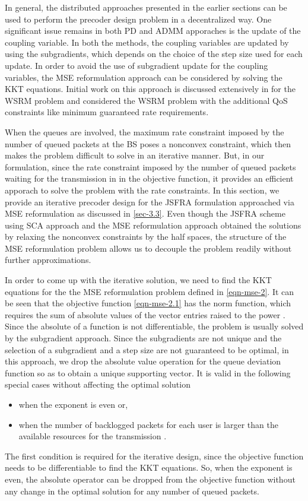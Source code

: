 
In general, the distributed approaches presented in the earlier sections can be used to perform the precoder design problem in a decentralized way. One significant issue remains in both \acl{PD} and \ac{ADMM} apporaches is the update of the coupling variable. In both the methods, the coupling variables are updated by using the subgradients, which depends on the choice of the step size used for each update. In order to avoid the use of subgradient update for the coupling variables, the \ac{MSE} reformulation approach can be considered by solving the \ac{KKT} equations. Initial work on this approach is discussed extensively in \cite{wmmse_shi} for the \ac{WSRM} problem and \cite{kaleva2012weighted} considered the \ac{WSRM} problem with the additional \ac{QoS} constraints like minimum guaranteed rate requirements.

When the queues are involved, the maximum rate constraint imposed by the number of queued packets at the \ac{BS} poses a nonconvex constraint, which then makes the problem difficult to solve in an iterative manner. But, in our formulation, since the rate constraint imposed by the number of queued packets waiting for the transmission in in the objective function, it provides an efficient apporach to solve the problem with the rate constraints. In this section, we provide an iterative precoder design for the \ac{JSFRA} formulation approached via \ac{MSE} reformulation as discussed in \ref{sec-3.3}. Even though the \ac{JSFRA} scheme using \ac{SCA} approach and the \ac{MSE} reformulation approach obtained the solutions by relaxing the nonconvex constraints by the half spaces, the structure of the \ac{MSE} reformulation problem allows us to decouple the problem readily without further approximations.

In order to come up with the iterative solution, we need to find the \ac{KKT} equations for the the \ac{MSE} reformulation problem defined in \eqref{eqn-mse-2}. It can be seen that the objective function \eqref{eqn-mse-2.1} has the norm function, which requires the sum of absolute values of the vector entries raised to the power . Since the absolute of a function is not differentiable, the problem is usually solved by the subgradient approach. Since the subgradients are not unique and the selection of a subgradient and a step size are not guaranteed to be optimal, in this approach, we drop the absolute value operation for the queue deviation function so as to obtain a unique supporting vector. It is valid in the following special cases without affecting the optimal solution
\begin{itemize}
\item when the exponent  is even or,
\item when the number of backlogged packets for each user is larger than the available resources for the transmission .
\end{itemize}
The first condition is required for the iterative design, since the objective function needs to be differentiable to find the \ac{KKT} equations. So, when the exponent  is even, the absolute operator can be dropped from the objective function without any change in the optimal solution for any number of queued packets.

